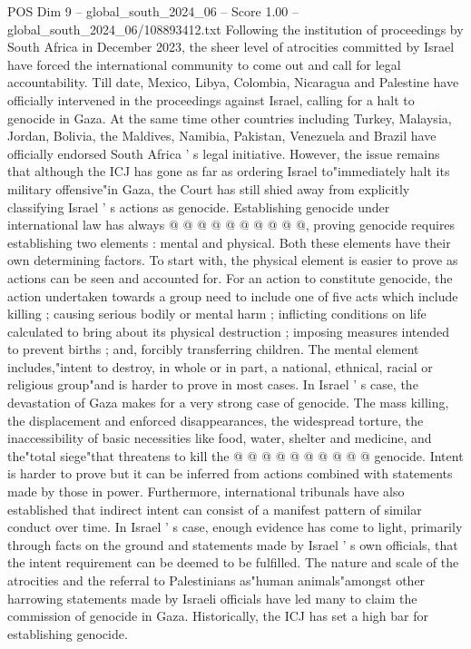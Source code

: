 \begin{textsample}{POS Dim 9 – global\_south\_2024\_06 – Score 1.00 – global\_south\_2024\_06/108893412.txt}
Following the institution of proceedings by South Africa in December 2023, the sheer level of atrocities committed by Israel have forced the international community to come out and call for legal accountability.
Till date, Mexico, Libya, Colombia, Nicaragua and Palestine have officially intervened in the proceedings against Israel, calling for a halt to genocide in Gaza.
At the same time other countries including Turkey, Malaysia, Jordan, Bolivia, the Maldives, Namibia, Pakistan, Venezuela and Brazil have officially endorsed South Africa ' s legal initiative.
However, the issue remains that although the ICJ has gone as far as ordering Israel to"immediately halt its military offensive"in Gaza, the Court has still shied away from explicitly classifying Israel ' s actions as genocide.
Establishing genocide under international law has always @ @ @ @ @ @ @ @ @ @, proving genocide requires establishing two elements : mental and physical.
Both these elements have their own determining factors.
To start with, the physical element is easier to prove as actions can be seen and accounted for.
For an action to constitute genocide, the action undertaken towards a group need to include one of five acts which include killing ; causing serious bodily or mental harm ; inflicting conditions on life calculated to bring about its physical destruction ; imposing measures intended to prevent births ; and, forcibly transferring children.
The mental element includes,"intent to destroy, in whole or in part, a national, ethnical, racial or religious group"and is harder to prove in most cases.
In Israel ' s case, the devastation of Gaza makes for a very strong case of genocide.
The mass killing, the displacement and enforced disappearances, the widespread torture, the inaccessibility of basic necessities like food, water, shelter and medicine, and the"total siege"that threatens to kill the @ @ @ @ @ @ @ @ @ @ genocide.
Intent is harder to prove but it can be inferred from actions combined with statements made by those in power.
Furthermore, international tribunals have also established that indirect intent can consist of a manifest pattern of similar conduct over time.
In Israel ' s case, enough evidence has come to light, primarily through facts on the ground and statements made by Israel ' s own officials, that the intent requirement can be deemed to be fulfilled.
The nature and scale of the atrocities and the referral to Palestinians as"human animals"amongst other harrowing statements made by Israeli officials have led many to claim the commission of genocide in Gaza.
Historically, the ICJ has set a high bar for establishing genocide.

\end{textsample}
